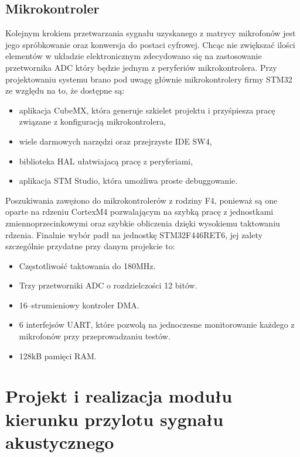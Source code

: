 \documentclass[eng,printmode]{mgr}
\begin{document}
\section{Mikrokontroler}
Kolejnym krokiem przetwarzania sygnału uzyskanego z matrycy mikrofonów jest jego spróbkowanie oraz konwersja do postaci cyfrowej. 
Chcąc nie zwiększać ilości elementów w układzie elektronicznym zdecydowano się na zastosowanie przetwornika ADC który będzie jednym z peryferiów mikrokontrolera. Przy projektowaniu systemu brano pod uwagę głównie mikrokontrolery firmy STM32 ze względu na to, że dostępne są:
\begin{itemize}
\item aplikacja CubeMX, która generuje szkielet projektu i przyśpiesza pracę związane z konfiguracją mikrokontrolera,
\item wiele darmowych narzędzi oraz przejrzyste IDE SW4,
\item biblioteka HAL ułatwiajacą pracę z peryferiami,
\item aplikacja STM Studio, która umożliwa proste debuggowanie.
\end{itemize} 
Poszukiwania zawężono do mikrokontrolerów z rodziny F4, ponieważ są one oparte na rdzeniu CortexM4 pozwalającym na szybką pracę z jednostkami zmiennoprzecinkowymi oraz szybkie obliczenia dzięki wysokiemu taktowaniu rdzenia. Finalnie wybór padł na jednostkę STM32F446RET6, jej zalety szczególnie przydatne przy danym projekcie to:
\begin{itemize}
\item Częstotliwość taktowania do 180MHz.
\item Trzy przetworniki ADC o rozdzielczości 12 bitów.
\item 16--strumieniowy kontroler DMA.
\item 6 interfejsów UART, które pozwolą na jednoczesne monitorowanie każdego z mikrofonów przy przeprowadzaniu testów.
\item 128kB pamięci RAM.
\end{itemize} 
\chapter{Projekt i realizacja modułu
 kierunku przylotu sygnału akustycznego}
 
\end{document}
